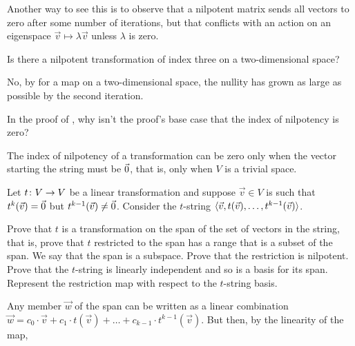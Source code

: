 \begin{exercises}
\begin{answer}
      Another way to see this is to observe that a nilpotent matrix sends all
      vectors to zero after some number of iterations, but that conflicts 
      with an action on an eigenspace $\vec{v}\mapsto \lambda\vec{v}$ unless
      $\lambda$ is zero.
    \end{answer}
  \item 
    Is there a nilpotent transformation of index three on a
    two-dimensional space?
    \begin{answer}
      No, by  for a map on a 
      two-dimensional space, the nullity has grown
      as large as possible by the second iteration.
    \end{answer}
  \item 
    In the proof of , why isn't the
    proof's base case that the index of nilpotency is zero?
    \begin{answer}
      The index of nilpotency of a transformation can be zero only when the 
      vector starting the string
      must be $\vec{0}$, that is, only when $V$ is a trivial space.
    \end{answer}
  \recommended \item
    Let \( \mbox{$t\colon V\to V$} \) be a linear transformation and suppose
    \( \vec{v}\in V \)  is such that \( t^k(\vec{v})=\vec{0} \) but
    \( t^{k-1}(\vec{v})\neq\vec{0} \).
    Consider the $t$-string 
    $\langle\vec{v},t(\vec{v}),\dots,t^{k-1}(\vec{v})\rangle$.
    \begin{exparts}
      \partsitem Prove that \( t \) is a transformation on the span of the set
        of vectors in the string,
        that is, prove that \( t \) restricted to the span has a range
        that is a subset of the span.
        We say that the span is a  
        subspace.
      \partsitem Prove that the restriction is nilpotent.
      \partsitem Prove that the $t$-string
        is linearly independent and so is a basis for its span.
      \partsitem Represent the restriction map with respect to the 
        $t$-string basis.
    \end{exparts}
    \begin{answer}
      \begin{exparts}
        \partsitem Any member $\vec{w}$ of the span can be written as
          a linear combination
          $\vec{w}=c_0\cdot \vec{v}+c_1\cdot t(\vec{v})+\dots
           +c_{k-1}\cdot t^{k-1}(\vec{v})$.
          But then, by the linearity of the map, 

\end{exparts}
\end{answer}
\end{exercises}

